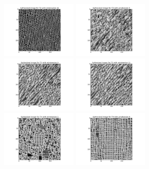 \documentclass{extarticle}
\theoremstyle{definition}
\theoremstyle{definition}
\begin{document}
\begin{figure}[H]
	\includegraphics[width = 0.33\textwidth]{./figures/Syth_T2_size_11.png}
	\includegraphics[width = 0.33\textwidth]{./figures/Syth_T3_size_5.png}
	\includegraphics[width = 0.33\textwidth]{./figures/Syth_T3_size_9.png}
	\includegraphics[width = 0.33\textwidth]{./figures/Syth_T3_size_11.png}
	\includegraphics[width = 0.33\textwidth]{./figures/Syth_T4_size_5.png}
	\includegraphics[width = 0.33\textwidth]{./figures/Syth_T4_size_9.png}

\end{figure}
\end{document}
